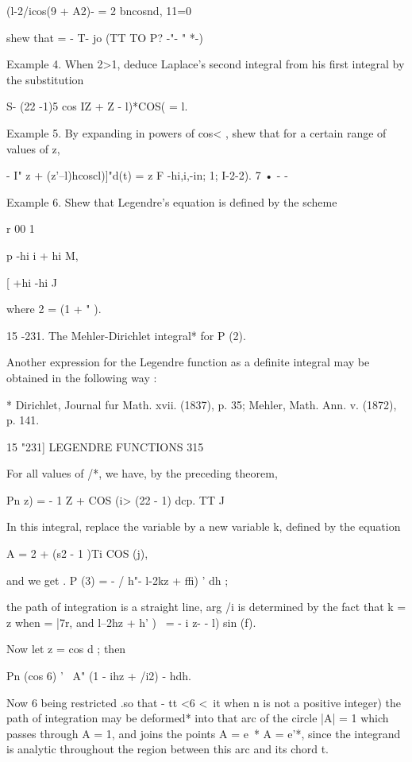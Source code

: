 {{(l-2/icos(9 + A2)- = 2 bncosnd, 
11=0 

shew that   = - T- jo (TT TO P? -"-  " *-) 

Example 4. When 2>1, deduce Laplace's second integral from his first integral by 
the substitution 

 S- (22 -1)5 cos    IZ +  Z - l)*COS(   = l. 

Example 5. By expanding in powers of cos< , shew that for a certain range of 
values of z, 

- I"  z + (z'--l)hcoscl)]"d(t) = z F -hi,i,-in; 1; I-2-2). 
  7 • - - 

Example 6. Shew that Legendre's equation is defined by the scheme 

r 00 1   

p  -hi i + hi M, 

[ +hi -hi J 

where 2 =  (1 + " ). 

15 -231. The Mehler-Dirichlet integral* for P  (2). 

Another expression for the Legendre function as a definite integral may be obtained in 
the following way : 

* Dirichlet, Journal fur Math. xvii. (1837), p. 35; Mehler, Math. Ann. v. (1872), p. 141. 



15 "231] LEGENDRE FUNCTIONS 315 

For all values of /*, we have, by the preceding theorem, 

Pn z) = - 1   Z + COS (i> (22 - 1)     dcp. 
TT J 

In this integral, replace the variable by a new variable k, defined by the equation 

A = 2 + (s2 - 1 )Ti COS (j), 

and we get . P  (3) = - / h"-  l-2kz + ffi) '   dh ; 

the path of integration is a straight line, arg /i is determined by the fact that k = z when 
  = |7r, and  l--2hz + h' )~ = - i  z- - l)  sin (f). 

Now let z = cos d ; then 

Pn (cos 6) ' \ A" (1 - ihz + /i2) - hdh. 

Now  6 being restricted .so that - tt <6 <\ it when n is not a positive integer) the 
path of integration may be deformed* into that arc of the circle |A| = 1 which passes 
through A = 1, and joins the points A = e~*  A = e'*, since the integrand is analytic throughout 
the region between this arc and its chord t. 

}}
